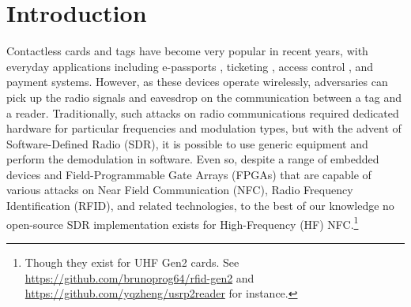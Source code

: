 \documentclass[fleqn,10pt]{SelfArx} %
\affiliation{\textsuperscript{1}\textit{CDT in Cyber Security, University of Oxford, Oxford, United Kingdom}} %
\begin{document}

\flushbottom %

\maketitle %


\thispagestyle{empty} %


\section{Introduction}
\label{sec:introduction}

Contactless cards and tags have become very popular in recent years, with everyday applications including e-passports \cite{epassports}, ticketing \cite{mbta, chipkaart, classicvulnerabilities}, access control \cite{imperial}, and payment \cite{relay, practicalrelay} systems. However, as these devices operate wirelessly, adversaries can pick up the radio signals and eavesdrop on the communication between a tag and a reader. Traditionally, such attacks on radio communications required dedicated hardware for particular frequencies and modulation types, but with the advent of Software-Defined Radio (SDR), it is possible to use generic equipment and perform the demodulation in software. Even so, despite a range of embedded devices and Field-Programmable Gate Arrays (FPGAs) that are capable of various attacks on Near Field Communication (NFC), Radio Frequency Identification (RFID), and related technologies, to the best of our knowledge no open-source SDR implementation exists for High-Frequency (HF) NFC.\footnote{Though they exist for UHF Gen2 cards. See \url{https://github.com/brunoprog64/rfid-gen2} and \url{https://github.com/yqzheng/usrp2reader} for instance.} 
\end{document}

